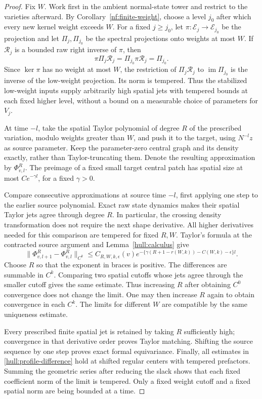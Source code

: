 \begin{proof}
Fix $W$. Work first in the ambient normal-state tower and restrict to
the varieties afterward. By Corollary~\ref{nf:finite-weight}, choose
a level $j_0$ after which every new kernel weight exceeds $W$.
For a fixed $j\ge j_0$, let $\pi:\mathcal E_j\to\mathcal E_{j_0}$
be the projection and let $\Pi_j,\Pi_{j_0}$ be the spectral projections
onto weights at most $W$. If $\mathcal R_j$ is a bounded raw right inverse of
$\pi$, then
\[
 \pi\Pi_j\mathcal R_j=\Pi_{j_0}\pi\mathcal R_j=\Pi_{j_0}.
\]
Since $\ker\pi$ has no weight at most $W$, the restriction of
$\Pi_j\mathcal R_j$ to $\operatorname{im}\Pi_{j_0}$ is the inverse of the
low-weight projection. Its norm is tempered. Thus the stabilized
low-weight inputs supply arbitrarily high spatial jets with tempered
bounds at each fixed higher level, without a bound on a measurable
choice of parameters for $V_j$.

At time $-l$, take the spatial Taylor polynomial of degree $R$ of the
prescribed variation, modulo weights greater than $W$, and push it to
the target, using $N^{-l}z$ as source parameter. Keep the parameter-zero
central graph and its density exactly, rather than Taylor-truncating
them. Denote the resulting approximation by $\Phi^{R}_{v,l}$.
The preimage of a fixed small target central patch has spatial size
at most $C e^{-\gamma l}$, for a fixed $\gamma>0$.

Compare consecutive approximations at source time $-l$, first applying
one step to the earlier source polynomial. Exact raw state dynamics
makes their spatial Taylor jets agree through degree $R$. In particular,
the crossing density transformation does not require the next shape
derivative. All higher derivatives needed for this comparison are
tempered for fixed $R,W$. Taylor's formula at the contracted source
argument and Lemma~\ref{hull:calculus} give
\begin{equation}\label{hull:profile-difference}
 \|\Phi^R_{v,l+1}-\Phi^R_{v,l}\|_{C^k}
 \le C_{R,W,k,\epsilon}(v)
 e^{-\{\gamma(R+1-r(W,k))-C(W,k)-\epsilon\}l}.
\end{equation}
Choose $R$ so that the exponent in braces is positive. The differences
are summable in $C^k$. Comparing two spatial cutoffs whose jets agree
through the smaller cutoff gives the same estimate. Thus increasing
$R$ after obtaining $C^0$ convergence does not change the limit.
One may then increase $R$ again to obtain convergence in each $C^k$.
The limits for different $W$ are compatible by the same uniqueness
estimate.

Every prescribed finite spatial jet is retained by taking $R$
sufficiently high; convergence in that derivative order proves Taylor
matching. Shifting the source sequence by one step proves exact formal
equivariance. Finally, all estimates in
\eqref{hull:profile-difference} hold at shifted regular centers with
tempered prefactors. Summing the geometric series after reducing the
slack shows that each fixed coefficient norm of the limit is tempered.
Only a fixed weight cutoff and a fixed spatial norm are being bounded
at a time.
\end{proof}

